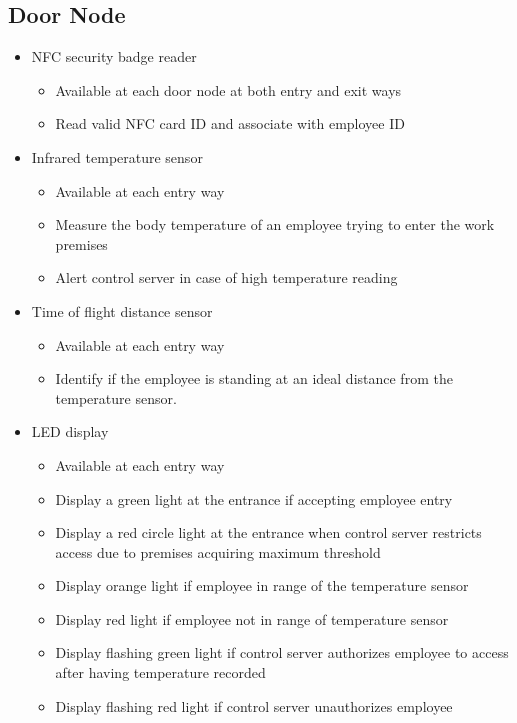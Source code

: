 \subsection{Door Node}
\begin{itemize}
    \item NFC security badge reader
    \begin{itemize}
        \item Available at each door node at both entry and exit ways
        \item Read valid NFC card ID and associate with employee ID
    \end{itemize}
    \item Infrared temperature sensor
    \begin{itemize}
        \item Available at each entry way
        \item Measure the body temperature of an employee trying to enter the
              work premises
        \item Alert control server in case of high temperature reading
    \end{itemize}
    \item Time of flight distance sensor
    \begin{itemize}
        \item Available at each entry way
        \item Identify if the employee is standing at an ideal distance from the
              temperature sensor.
    \end{itemize}
    \item LED display
    \begin{itemize}
        \item Available at each entry way
        \item Display a green light at the entrance if accepting employee entry
        \item Display a red circle light at the entrance when control server
              restricts access due to premises acquiring maximum threshold
        \item Display orange light if employee in range of the temperature
              sensor
        \item Display red light if employee not in range of temperature sensor
        \item Display flashing green light if control server authorizes employee
              to access after having temperature recorded
        \item Display flashing red light if control server unauthorizes employee

\end{itemize}
\end{itemize}
